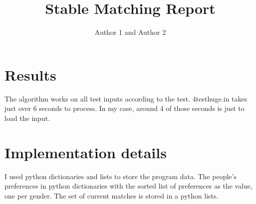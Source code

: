 \documentclass{article}
\title{Stable Matching Report}
\author{Author 1 and Author 2}
\begin{document}
  \maketitle

  \section{Results}

  The algorithm works on all test inputs according to the test.
  4testhuge.in takes just over 6 seconds to process. In my case, around 4 of those seconds is just to load the input.

  \section{Implementation details}

  I used python dictionaries and lists to store the program data.
  The people's preferences in python dictionaries with the sorted list of preferences as the value, one per gender.
  The set of current matches is stored in a python lists.
\end{document}
